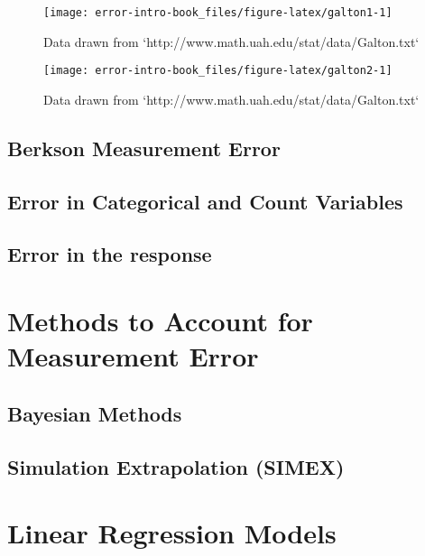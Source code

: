 \documentclass[]{book}
\theoremstyle{definition}
\theoremstyle{definition}
\theoremstyle{definition}
\theoremstyle{remark}
\begin{document}
\begin{figure}

{\centering \texttt{[image: error-intro-book\_files/figure-latex/galton1-1]} 

}

\caption{Data drawn from `http://www.math.uah.edu/stat/data/Galton.txt`}\label{fig:galton1}
\end{figure}

\begin{figure}

{\centering \texttt{[image: error-intro-book\_files/figure-latex/galton2-1]} 

}

\caption{Data drawn from `http://www.math.uah.edu/stat/data/Galton.txt`}\label{fig:galton2}
\end{figure}

\citep{fuller1987, galton1886}

\section{Berkson Measurement Error}\label{berkson-measurement-error-1}

\section{Error in Categorical and Count
Variables}\label{error-in-categorical-and-count-variables}

\section{Error in the response}\label{error-in-the-response}

\chapter{Methods to Account for Measurement Error}\label{accounting}

\section{Bayesian Methods}\label{bayesian-methods}

\section{Simulation Extrapolation
(SIMEX)}\label{simulation-extrapolation-simex}

\chapter{Linear Regression Models}\label{LinReg}
\end{document}

